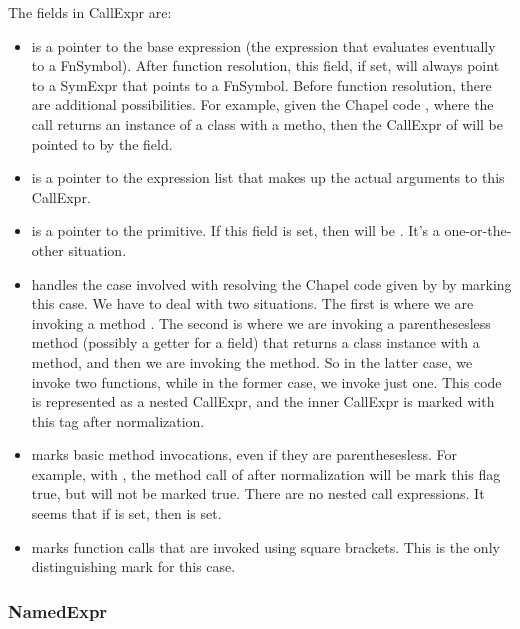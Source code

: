 \documentclass[10pt]{article}
\begin{document}
The fields in CallExpr are:
\begin{itemize}
\item {} is a pointer to the base expression (the
  expression that evaluates eventually to a FnSymbol).  After function
  resolution, this field, if set, will always point to a SymExpr that
  points to a FnSymbol.  Before function resolution, there are
  additional possibilities.  For example, given the Chapel code
  , where the call  returns an instance of a
  class with a  metho, then the CallExpr of  will
  be pointed to by the  field.
\item {} is a pointer to the expression list that
  makes up the actual arguments to this CallExpr.
\item {} is a pointer to the primitive.  If
  this field is set, then  will be .  It's a
  one-or-the-other situation.
\item {} handles the case involved with resolving
  the Chapel code given by  by marking this case.  We have
  to deal with two situations.  The first is where we are invoking a
  method .  The second is where we are invoking a
  parenthesesless method (possibly a getter for a field) that returns
  a class instance with a  method, and then we are invoking
  the  method.  So in the latter case, we invoke two
  functions, while in the former case, we invoke just one.  This code
  is represented as a nested CallExpr, and the inner CallExpr is
  marked with this tag after normalization.
\item {} marks basic method invocations, even if they
  are parenthesesless.  For example, with , the method call
  of  after normalization will be mark this flag true, but
   will not be marked true.  There are no nested call
  expressions.  It seems that if  is set, then
   is set.
\item {} marks function calls that are invoked using
  square brackets.  This is the only distinguishing mark for this
  case.
\end{itemize}

\subsubsection{NamedExpr}
\label{sec:namedexpr}
\end{document}
